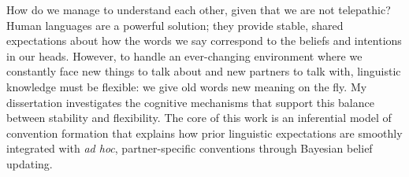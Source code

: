 
How do we manage to understand each other, given that we are not telepathic? 
Human languages are a powerful solution; %
they provide stable, shared expectations about how the words we say correspond to the beliefs and intentions in our heads.
However, to handle an ever-changing environment where we constantly face new things to talk about and new partners to talk with, linguistic knowledge must be flexible: we give old words new meaning on the fly.
My dissertation investigates the cognitive mechanisms that support this balance between stability and flexibility. %
The core of this work is an inferential model of convention formation that explains how prior linguistic expectations are smoothly integrated with \emph{ad hoc}, partner-specific conventions through Bayesian belief updating. %

